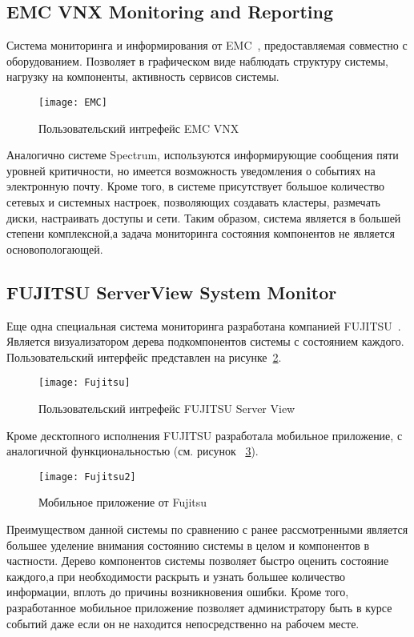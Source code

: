 \subsection{EMC VNX Monitoring and Reporting}
Система мониторинга и информирования от EMC~\cite{EMC}, предоставляемая совместно с оборудованием. Позволяет в графическом виде наблюдать структуру системы, нагрузку на компоненты, активность сервисов системы. 
\begin{figure}[!h]
	\centering
	\texttt{[image: EMC]}
	\caption{Пользовательский интрефейс EMC VNX}
	\label{fig:EMC}
\end{figure}
Аналогично системе Spectrum, используются информирующие сообщения пяти уровней критичности, но имеется возможность уведомления о событиях на электронную почту. Кроме того, в системе присутствует большое количество сетевых и системных настроек, позволяющих создавать кластеры, размечать диски, настраивать доступы и сети. Таким образом, система является в большей степени комплексной,а задача мониторинга состояния компонентов не является основопологающей. 

\subsection{FUJITSU ServerView System Monitor}
Еще одна специальная система мониторинга разработана компанией FUJITSU~\cite{Fujitsu}. Является визуализатором дерева подкомпонентов системы с состоянием каждого. Пользовательский интерфейс представлен на рисунке~\ref{fig:Fujitsu}.  
\begin{figure}[!h]
	\centering
	\texttt{[image: Fujitsu]}
	\caption{Пользовательский интрефейс FUJITSU Server View}
	\label{fig:Fujitsu}
\end{figure}
Кроме десктопного исполнения FUJITSU разработала мобильное приложение, с аналогичной функциональностью (см. рисунок ~\ref{fig:Fujitsu2}).
\begin{figure}[!h]
	\centering
	\texttt{[image: Fujitsu2]}
	\caption{Мобильное приложение от Fujitsu}
	\label{fig:Fujitsu2}
\end{figure}

Преимуществом данной системы по сравнению с ранее рассмотренными является большее уделение внимания состоянию системы в целом и компонентов в частности. Дерево компонентов системы позволяет быстро оценить состояние каждого,а при необходимости раскрыть и узнать большее количество информации, вплоть до причины возникновения ошибки. Кроме того, разработанное мобильное приложение позволяет администратору быть в курсе событий даже если он не находится непосредственно на рабочем месте. 

